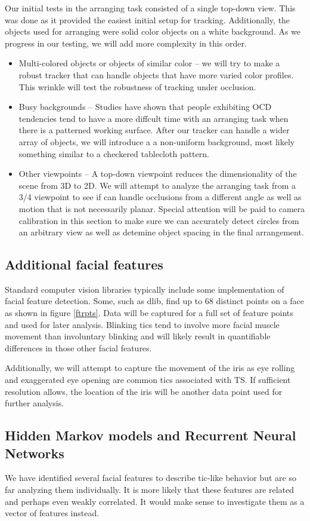 \documentclass[11pt]{article}
\begin{document}
Our initial tests in the arranging task consisted of a single top-down view. This was done as it provided the easiest initial setup for tracking. Additionally, the objects used for arranging were solid color objects on a white background. As we progress in our testing, we will add more complexity in this order.
\begin{itemize}
	\item{Multi-colored objects or objects of similar color -- we will try to make a robust tracker that can handle objects that have more varied color profiles. This wrinkle will test the robustness of tracking under occlusion.}
	\item{Busy backgrounds -- Studies have shown that people exhibiting OCD tendencies tend to have a more diffcult time with an arranging task when there is a patterned working surface. After our tracker can handle a wider array of objects, we will introduce a a non-uniform background, most likely something similar to a checkered tablecloth pattern.}
	\item{Other viewpoints -- A top-down viewpoint reduces the dimensionality of the scene from 3D to 2D. We will attempt to analyze the arranging task from a 3/4 viewpoint to see if can handle occlusions from a different angle as well as motion that is not necessarily planar. Special attention will be paid to camera calibration in this section to make sure we can accurately detect circles from an arbitrary view as well as detemine object spacing in the final arrangement.}
\end{itemize}
\subsection{Additional facial features}
Standard computer vision libraries typically include some implementation of facial feature detection. Some, such as dlib, find up to 68 distinct points on a face as shown in figure \ref{ftrpts}. Data will be captured for a full set of feature points and used for later analysis. Blinking tics tend to involve more facial muscle movement than involuntary blinking and will likely result in quantifiable differences in those other facial features.

Additionally, we will attempt to capture the movement of the iris as eye rolling and exaggerated eye opening are common tics associated with TS. If sufficient resolution allows, the location of the iris will be another data point used for further analysis.

\subsection{Hidden Markov models and Recurrent Neural Networks}
We have identified several facial features to  describe tic-like behavior but are so far analyzing them individually. It is more likely that these features are related and perhaps even weakly correlated. It would make sense to investigate them as a vector of features instead.
\end{document}
